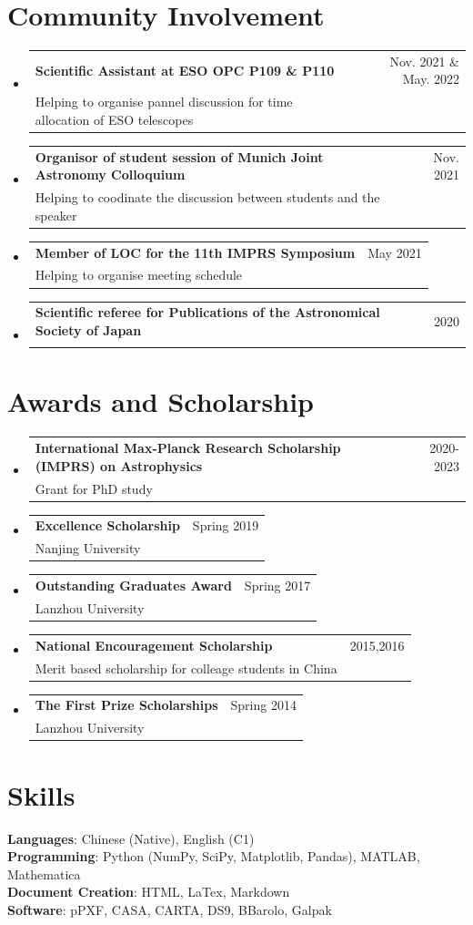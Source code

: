 \documentclass[A4,11pt]{article}
\makeatletter
\newcommand{\CVSubheading}[4]{
  \vspace{-2pt}\item
    \begin{tabular*}{0.97\textwidth}[t]{l@{\extracolsep{\fill}}r}
      \textbf{#1} & #2 \\
      \small#3 & \small #4 \\
    \end{tabular*}\vspace{-7pt}
}
\newcommand{\CVSubHeadingListStart}{\begin{itemize}[leftmargin=0.5cm, label={}]}
\newcommand{\CVSubHeadingListEnd}{\end{itemize}}
\makeatother
\begin{document}
\section{Community Involvement}
  \CVSubHeadingListStart
    \CVSubheading
      {Scientific Assistant at ESO OPC P109 \& P110}{Nov. 2021 \& May. 2022}
      {Helping to organise pannel discussion for time allocation of ESO telescopes}{}
    \CVSubheading
      {Organisor of student session of Munich Joint Astronomy Colloquium}{Nov. 2021}
      {Helping to coodinate the discussion between students and the speaker}{}
    \CVSubheading
      {Member of LOC for the 11th IMPRS Symposium}{May 2021}
      {Helping to organise meeting schedule}{}

    \CVSubheading
      {Scientific referee for Publications of the Astronomical Society of Japan}{2020}
      {}{}
  \CVSubHeadingListEnd

\section{Awards and Scholarship}
  \CVSubHeadingListStart
    \CVSubheading
      {International Max-Planck Research Scholarship (IMPRS) on Astrophysics}{2020-2023}
      {Grant for PhD study}{}
    \CVSubheading
      {Excellence Scholarship}{Spring 2019}
      {Nanjing University}{}
    \CVSubheading
      {Outstanding Graduates Award}{Spring 2017}
      {Lanzhou University}{}
    \CVSubheading
      {National Encouragement Scholarship}{2015,2016}
      {Merit based scholarship for colleage students in China}{}
    \CVSubheading
      {The First Prize Scholarships}{Spring 2014}
      {Lanzhou University}{}
  \CVSubHeadingListEnd

\section{Skills}
 \begin{itemize}[leftmargin=0.5cm, label={}]
    \small{\item{
     \textbf{Languages}{: Chinese (Native), English (C1)} \\
     \textbf{Programming}{: Python (NumPy, SciPy, Matplotlib, Pandas), MATLAB, Mathematica} \\
     \textbf{Document Creation}{: HTML, LaTex, Markdown} \\
     \textbf{Software}{: pPXF, CASA, CARTA, DS9, BBarolo, Galpak}
    }}
 \end{itemize}
\end{document}
